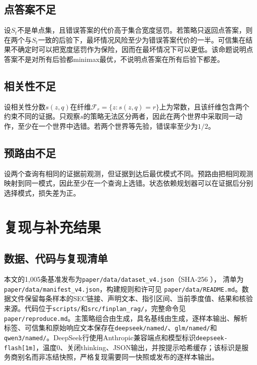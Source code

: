 \documentclass[12pt,openany]{ctexbook}
\begin{document}
\section{点答案不足}
设$S_t$不是单点集，且错误答案的代价高于集合宽度惩罚。若策略只返回点答案，则在两个与$S_t$一致的后验下，最坏情况风险至少为错误答案代价的一半。可信集在结果不确定时可以把宽度惩罚作为保险，因而在最坏情况下可以更低。该命题说明点答案不是对所有后验都minimax最优，不说明点答案在所有后验下都差。\par
\section{相关性不足}
设相关性分数$s(z,q)$在纤维$\mathcal{F}_r=\{z:s(z,q)=r\}$上为常数，且该纤维包含两个约束不同的证据。只观察$s$的策略无法区分两者，因此在两个世界中采取同一动作，至少在一个世界中选错。若两个世界等先验，错误率至少为$1/2$。\par
\section{预路由不足}
设两个查询有相同的证据前观测，但证据到达后最优模式不同。预路由把相同观测映射到同一模式，因此至少在一个查询上选错。状态依赖规划器可以在证据后分别选择模式，损失差为正。\par

\chapter{复现与补充结果}
\label{app:reproduce}
\section{数据、代码与复现清单}
\label{app:data}
本文的1,005条基准发布为\texttt{paper/\allowbreak data/\allowbreak dataset\_v4.json}（SHA-256
\texttt{}），
清单为\texttt{paper/\allowbreak data/\allowbreak manifest\_v4.json}，构建规则和许可见
\texttt{paper/\allowbreak data/\allowbreak README.md}。数据文件保留每条样本的SEC链接、声明文本、指引区间、当前季度值、结果和核验来源。代码位于\texttt{scripts/}和\texttt{src/finplan\_rag/}，完整命令见\texttt{paper/reproduce.md}。主策略组合由生成，具名基线由生成，逐样本输出、解析标签、可信集和原始响应文本保存在\allowbreak\texttt{deepseek/named/}、\allowbreak\texttt{glm/named/}和\allowbreak\texttt{qwen3/named/}。DeepSeek行使用Anthropic兼容端点和模型标识\texttt{deepseek-flash[1m]}，温度0、关闭thinking、JSON输出，并按提示哈希缓存；该标识是服务商别名而非冻结快照，严格复现需要同一快照或发布的逐样本输出。\par
\end{document}

